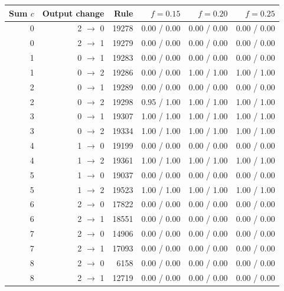 \begin{center}
\begin{minipage}{\linewidth}\centering
\captionsetup{type=table,hypcap=false}
\caption{All changes to one response in Rule~19280. Each entry gives the majority probability with the technical traders held / active over 20 starting markets; the changed rule remained in use. The output labels are Buy $=0$, Hold $=1$, Sell $=2$.}
\label{tab:revision-rules}
\footnotesize
\begin{tabular}{rrrrrr}
\toprule
Sum $c$ & Output change & Rule & $f=0.15$ & $f=0.20$ & $f=0.25$ \\
\midrule
0 & 2 $\to$ 0 & 19278 & 0.00 / 0.00 & 0.00 / 0.00 & 0.00 / 0.00 \\
0 & 2 $\to$ 1 & 19279 & 0.00 / 0.00 & 0.00 / 0.00 & 0.00 / 0.00 \\
1 & 0 $\to$ 1 & 19283 & 0.00 / 0.00 & 0.00 / 0.00 & 0.00 / 0.00 \\
1 & 0 $\to$ 2 & 19286 & 0.00 / 0.00 & 1.00 / 1.00 & 1.00 / 1.00 \\
2 & 0 $\to$ 1 & 19289 & 0.00 / 0.00 & 0.00 / 0.00 & 0.00 / 0.00 \\
2 & 0 $\to$ 2 & 19298 & 0.95 / 1.00 & 1.00 / 1.00 & 1.00 / 1.00 \\
3 & 0 $\to$ 1 & 19307 & 1.00 / 1.00 & 1.00 / 1.00 & 1.00 / 1.00 \\
3 & 0 $\to$ 2 & 19334 & 1.00 / 1.00 & 1.00 / 1.00 & 1.00 / 1.00 \\
4 & 1 $\to$ 0 & 19199 & 0.00 / 0.00 & 0.00 / 0.00 & 0.00 / 0.00 \\
4 & 1 $\to$ 2 & 19361 & 1.00 / 1.00 & 1.00 / 1.00 & 1.00 / 1.00 \\
5 & 1 $\to$ 0 & 19037 & 0.00 / 0.00 & 0.00 / 0.00 & 0.00 / 0.00 \\
5 & 1 $\to$ 2 & 19523 & 1.00 / 1.00 & 1.00 / 1.00 & 1.00 / 1.00 \\
6 & 2 $\to$ 0 & 17822 & 0.00 / 0.00 & 0.00 / 0.00 & 0.00 / 0.00 \\
6 & 2 $\to$ 1 & 18551 & 0.00 / 0.00 & 0.00 / 0.00 & 0.00 / 0.00 \\
7 & 2 $\to$ 0 & 14906 & 0.00 / 0.00 & 0.00 / 0.00 & 0.00 / 0.00 \\
7 & 2 $\to$ 1 & 17093 & 0.00 / 0.00 & 0.00 / 0.00 & 0.00 / 0.00 \\
8 & 2 $\to$ 0 & 6158 & 0.00 / 0.00 & 0.00 / 0.00 & 0.00 / 0.00 \\
8 & 2 $\to$ 1 & 12719 & 0.00 / 0.00 & 0.00 / 0.00 & 0.00 / 0.00 \\
\bottomrule
\end{tabular}
\end{minipage}
\end{center}

